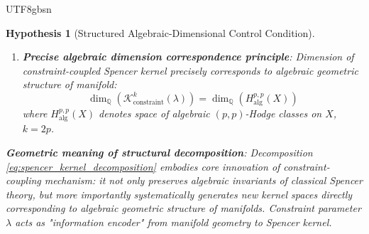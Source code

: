 \documentclass[a4paper,12pt]{extarticle}
\newtheorem{hypothesis}[theorem]{Hypothesis}
\theoremstyle{definition}
\begin{document}
\begin{CJK}{UTF8}{gbsn}
\begin{hypothesis}[Structured Algebraic-Dimensional Control Condition]
\begin{enumerate}
    \item \textbf{Precise algebraic dimension correspondence principle}: Dimension of constraint-coupled Spencer kernel precisely corresponds to algebraic geometric structure of manifold:
    \begin{equation}
    \label{eq:precise_algebraic_dimension_correspondence}
    \dim_{\mathbb{Q}}(\mathcal{K}^k_{\text{constraint}}(\lambda)) = \dim_{\mathbb{Q}}(H_{\text{alg}}^{p,p}(X))
    \end{equation}
    where $H_{\text{alg}}^{p,p}(X)$ denotes space of algebraic $(p,p)$-Hodge classes on $X$, $k = 2p$.
\end{enumerate}

\textbf{Geometric meaning of structural decomposition}: Decomposition \eqref{eq:spencer_kernel_decomposition} embodies core innovation of constraint-coupling mechanism: it not only preserves algebraic invariants of classical Spencer theory, but more importantly systematically generates new kernel spaces directly corresponding to algebraic geometric structure of manifolds. Constraint parameter $\lambda$ acts as "information encoder" from manifold geometry to Spencer kernel.
\end{hypothesis}


\end{CJK}
\end{document}
